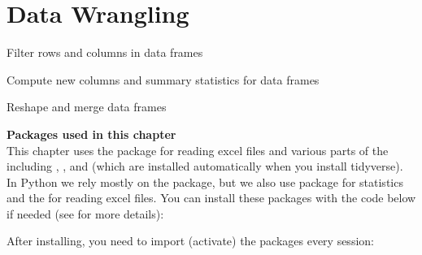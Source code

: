 \chapter{Data Wrangling}
\label{chap:datawrangling}

\begin{abstract}{Abstract}
This chapter shows you how to do `data wrangling' in R and Python.
Data wrangling is the process of transforming raw data into a shape that is suitable for analysis. The sections of this chapter first take you through the normal data wrangling pipeline of
filtering, changing, grouping, and joining data. Finally, the last section shows how you can
reshape data.
\end{abstract}


\begin{objectives}
\item Filter rows and columns in data frames
\item Compute new columns and summary statistics for data frames
\item Reshape and merge data frames
\end{objectives}

\newpage
\begin{feature}
  \textbf{Packages used in this chapter}\\
  This chapter uses the  package for reading excel files and various parts of the  including , , and  (which are installed automatically when you install tidyverse). In Python we rely mostly on the  package, but we also use  package for statistics and the  for reading excel files. You can install these packages with the code below if needed  
  (see  for more details):
  

\noindent After installing, you need to import (activate) the packages every session:

  
\end{feature}






